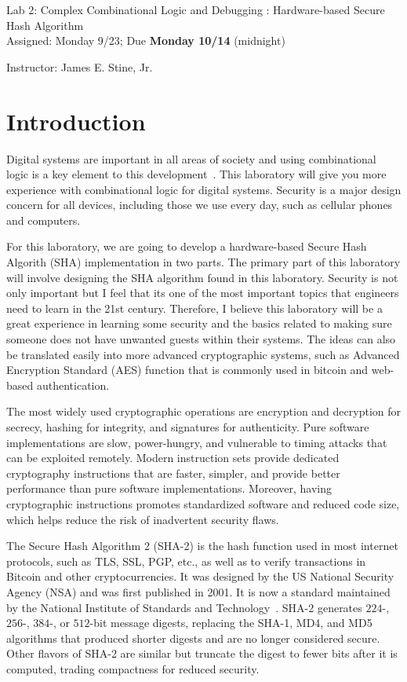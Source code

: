 \documentclass{article}
\newcommand{\myassignment}{Lab 2: Complex Combinational Logic and Debugging : Hardware-based Secure Hash Algorithm}
\newcommand{\myduedate}{Assigned: Monday 9/23; Due \textbf{Monday 10/14} (midnight)}
\newcommand{\myinstructor}{Instructor: James E. Stine, Jr.}
\begin{document}
\begin{center}
  {\huge \myassignment} \\
  {\large \myduedate} \\
  \begin{flushright}
  \myinstructor \\
  \end{flushright}
\end{center}

\section{Introduction}

Digital systems are important in all areas of society and using
combinational logic is a key element to this
development~\cite{ddca-riscv}.  This
laboratory will give you more experience with combinational logic
for digital systems.  
Security is a major design concern for all devices, including those  we
use every day, such as cellular phones and computers.

For this laboratory, we are going to develop a hardware-based Secure Hash Algorith (SHA)
implementation
in two parts.  The primary part of this laboratory will involve designing the 
SHA algorithm found in this laboratory.
Security is not only important but I feel that its one of the most important
topics that engineers
need to learn in the 21st century.  Therefore, I
believe this laboratory will be a great experience in learning some
security and the basics related to making sure someone does not have
unwanted guests within their systems.  The ideas can also be
translated easily into more advanced cryptographic systems, such as
Advanced Encryption Standard (AES) function that is
commonly used in bitcoin and web-based authentication.

The most widely used cryptographic operations are encryption and
decryption for secrecy, hashing for integrity, and signatures for
authenticity. Pure software implementations are slow, power-hungry,
and vulnerable to timing attacks that can be exploited
remotely. Modern instruction sets provide dedicated cryptography
instructions that are faster, simpler, and provide better performance
than pure software implementations. Moreover, having cryptographic
instructions promotes standardized software and reduced code size,
which helps reduce the risk of inadvertent security flaws. 

The Secure Hash Algorithm 2 (SHA-2) is the hash function used in most
internet protocols, such as TLS, SSL, PGP, etc., as well as to verify
transactions in Bitcoin and other cryptocurrencies. It was designed by
the US National Security Agency (NSA) and was first published in
2001. It is now a standard maintained by the National Institute of
Standards and Technology~\cite{1250396}.
SHA-2 generates $224$-, $256$-, $384$-, or $512$-bit message digests,
replacing the SHA-1, MD4, and MD5 algorithms that produced shorter
digests and are no longer considered secure. 
Other flavors of SHA-2 are similar but truncate the digest to
fewer bits after it is computed, trading compactness for reduced
security. 
\end{document}
